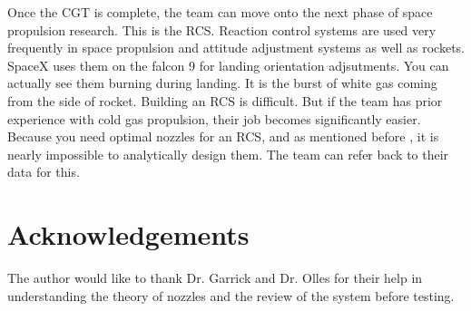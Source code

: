 \documentclass[conference]{IEEEtran} %
\begin{document}
Once the CGT is complete, the team can move onto the next phase of space propulsion research. This is the RCS\@. Reaction control systems are used very
frequently in space propulsion and attitude adjustment systems as well as rockets. SpaceX uses them on the falcon 9 for landing orientation adjsutments. You
can actually see them burning during landing. It is the burst of white gas coming from the side of rocket. Building an RCS is difficult. But if the team
has prior experience with cold gas propulsion, their job becomes significantly easier. Because you need optimal nozzles for an RCS, and as mentioned before
, it is nearly impossible to analytically design them. The team can refer back to their data for this.

\section*{Acknowledgements}
The author would like to thank Dr. Garrick and Dr. Olles for their help in understanding the theory of nozzles and the review of the system before testing.

\onecolumn
\appendices{}
\end{document}
